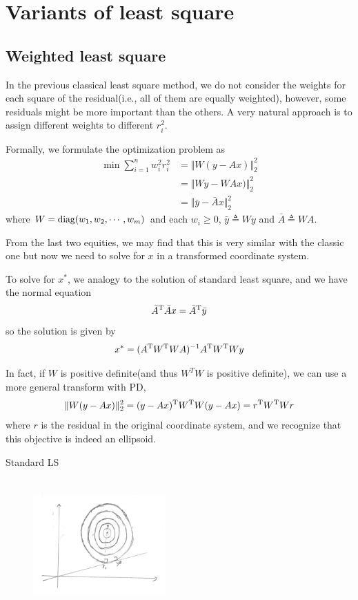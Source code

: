 \section{Variants of least square}

\subsection{Weighted least square}
In the previous classical least square method, we do not consider the weights for each square of the residual(i.e., all of them are equally weighted), however, some residuals might be more important than the others. A very natural approach is to assign different weights to different $r_i^2$.

Formally, we formulate the optimization problem as
\begin{align*}
\min \sum_{i=1}^{n} w_i^2 r_i^2
&=\Vert W (y-Ax)\Vert ^2_2\\
&=\Vert Wy-WAx)\Vert ^2_2\\
&=\Vert \bar{y}-\bar{A}x \Vert ^2_2
\end{align*}
where $W=\operatorname{diag}(w_1, w_2, \cdots, w_m)$ and each $w_i\geq 0$, $\bar{y} \triangleq Wy$ and $\bar{A} \triangleq WA$. 

From the last two equities, we may find that this is very similar with the classic one but now we need to solve for $x$ in a transformed coordinate system.

To solve for $x^*$, we analogy to the solution of standard least square, and we have the normal equation
$$\bar{A}^{{\rm T}} \bar{A} x=\bar{A}^{{\rm T}} \bar{y}$$
so the solution is given by
$$x^*=(A^{{\rm T}} W^{{\rm T}} W A)^{-1} A^{{\rm T}} W^{{\rm T}} W y$$


In fact, if $W$ is positive definite(and thus $W^T W$ is positive definite), we can use a more general transform with PD, 
$$\Vert W (y-Ax)\Vert ^2_2 = (y-Ax)^{{\rm T}}W^{{\rm T}}W(y-Ax)=r^{{\rm T}}W^{{\rm T}}Wr$$
where $r$ is the residual in the original coordinate system, and we recognize that this objective is indeed an ellipsoid.

\newpage
\vspace{0.3cm}
Standard LS
\begin{figure}
	\centering
	\includegraphics[width=2in,height=2in]{figures/ch06/ch06-03.jpg}
\end{figure}

